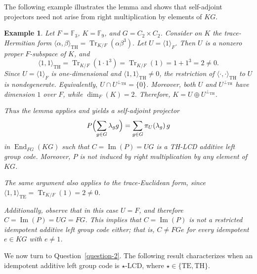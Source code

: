 \documentclass[11pt]{article}
\newtheorem{example}[theorem]{Example}
\begin{document}
The following example illustrates the lemma and shows that self-adjoint projectors need not arise from right multiplication by elements of $KG$.

\begin{example}
Let $F=\mathbb{F}_3$, $K=\mathbb{F}_9$, and $G=C_2\times C_2$. Consider on $K$ the trace-Hermitian form
$
\langle\alpha,\beta\rangle_{\mathrm{TH}}=\operatorname{Tr}_{K/F}(\alpha\beta^3).
$
Let $U=\langle 1\rangle_F$. Then $U$ is a nonzero proper $F$-subspace of $K$, and
$$
\langle 1,1\rangle_{\mathrm{TH}}
=
\operatorname{Tr}_{K/F}(1\cdot 1^3)
=
\operatorname{Tr}_{K/F}(1)
=
1+1^3
=
2\neq 0.
$$
Since $U=\langle 1\rangle_F$ is one-dimensional and $\langle 1,1\rangle_{\mathrm{TH}}\neq 0$, the restriction of $\langle\cdot,\cdot\rangle_{\mathrm{TH}}$ to $U$ is nondegenerate. Equivalently, $U\cap U^{\perp_{\mathrm{TH}}}=\{0\}$. Moreover, both $U$ and $U^{\perp_{\mathrm{TH}}}$ have dimension $1$ over $F$, while $\dim_F(K)=2$. Therefore, $K=U\oplus U^{\perp_{\mathrm{TH}}}$.

Thus the lemma applies and yields a self-adjoint projector
$$
P\Bigl(\sum_{g\in G}\lambda_g g\Bigr)=\sum_{g\in G}\pi_U(\lambda_g)\,g
$$
in $\operatorname{End}_{FG}(KG)$ such that $C=\operatorname{Im}(P)=UG$ is a TH-LCD additive left group code. Moreover, $P$ is not induced by right multiplication by any element of $KG$.

The same argument also applies to the trace-Euclidean form, since $\langle 1,1\rangle_{\mathrm{TE}}=\operatorname{Tr}_{K/F}(1)=2\neq 0$.

Additionally, observe that in this case $U = F$, and therefore $C = \operatorname{Im}(P) = UG = FG$. This implies that $C = \operatorname{Im}(P)$ is not a restricted idempotent additive left group code either; that is, $C \neq FGe$ for every idempotent $e \in KG$ with $e \neq 1$.
\end{example}



We now turn to Question~\ref{question-2}. The following result characterizes when an idempotent additive left group code is $\star$-LCD, where $\star\in\{\mathrm{TE},\mathrm{TH}\}$.
\end{document}
